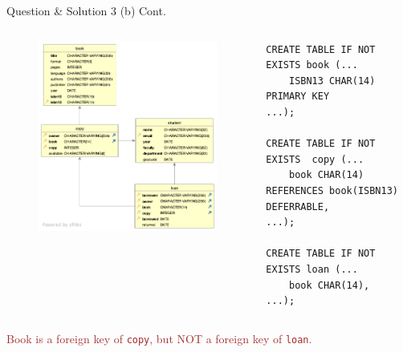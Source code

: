 \begin{frame}[fragile]{Question \& Solution 3 (b) Cont.}
\begin{columns}
	\begin{figure}
		\includegraphics[width=1\textwidth]{t1/images/t1-0.png}
	\end{figure}
		
\begin{lstlisting}
CREATE TABLE IF NOT EXISTS book (...
	ISBN13 CHAR(14) PRIMARY KEY
...);
		
CREATE TABLE IF NOT EXISTS  copy (...
	book CHAR(14) REFERENCES book(ISBN13) DEFERRABLE,
...);
		
CREATE TABLE IF NOT EXISTS loan (...
	book CHAR(14),
...);
\end{lstlisting}
\end{columns}
\vspace{10pt}
\textcolor{brown}{Book is a foreign key of \texttt{copy}, but NOT a foreign key of \texttt{loan}.}
\end{frame}


